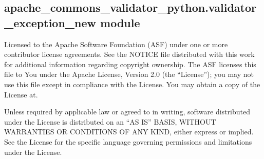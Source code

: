 \documentclass[letterpaper,10pt,english]{sphinxmanual}
\begin{document}
\subsection{apache\_commons\_validator\_python.validator\_exception\_new module}
\label{\detokenize{apache_commons_validator_python:module-apache_commons_validator_python.validator_exception_new}}\label{\detokenize{apache_commons_validator_python:apache-commons-validator-python-validator-exception-new-module}}
\sphinxAtStartPar
Licensed to the Apache Software Foundation (ASF) under one or more contributor
license agreements.  See the NOTICE file distributed with this work for additional
information regarding copyright ownership. The ASF licenses this file to You under the
Apache License, Version 2.0 (the “License”); you may not use this file except in
compliance with the License.  You may obtain a copy of the License at.

\sphinxAtStartPar
{}

\sphinxAtStartPar
Unless required by applicable law or agreed to in writing, software
distributed under the License is distributed on an “AS IS” BASIS,
WITHOUT WARRANTIES OR CONDITIONS OF ANY KIND, either express or implied.
See the License for the specific language governing permissions and
limitations under the License.
\end{document}

